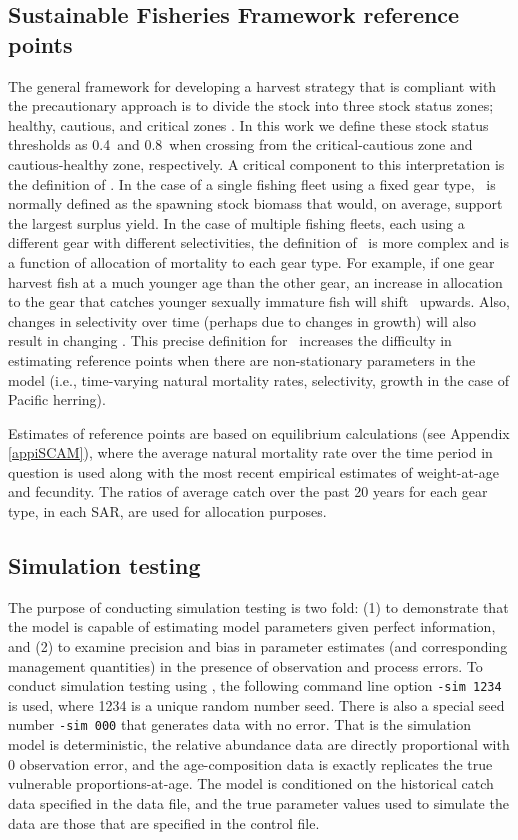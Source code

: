 	\subsection{Sustainable Fisheries Framework reference points}
	The general framework for developing a harvest strategy that is compliant with the precautionary approach is to divide the stock into three stock status zones; healthy, cautious, and critical zones \citep{dfo2006}.  In this work we define these stock status thresholds as 0.4\bmsy\ and 0.8\bmsy\ when crossing from the critical-cautious zone and cautious-healthy zone, respectively.  A critical component to this interpretation is the definition of \bmsy.  In the case of a single fishing fleet using a fixed gear type, \bmsy\ is normally defined as the spawning stock biomass that would, on average, support the largest surplus yield.  In the case of multiple fishing fleets, each using a different gear with different selectivities, the definition of \bmsy\ is more complex and is a function of allocation of mortality to each gear type.  For example, if one gear harvest fish at a much younger age than the other gear, an increase in allocation to the gear that catches younger sexually immature fish will shift \bmsy\ upwards. Also, changes in selectivity over time (perhaps due to changes in growth) will also result in changing \bmsy.  This precise definition for \bmsy\ increases the difficulty in estimating reference points when there are non-stationary parameters in the model (i.e., time-varying natural mortality rates, selectivity, growth in the case of Pacific herring).
	
	Estimates of reference points are based on equilibrium calculations (see Appendix \ref{appiSCAM}), where the average natural mortality rate over the time period in question is used along with the most recent empirical estimates of weight-at-age and fecundity.  The ratios of average catch over the past 20 years for each gear type, in each SAR, are used for allocation purposes. 
	
	
	

	
	\subsection{Simulation testing}
	
		The purpose of conducting simulation testing is two fold: (1) to demonstrate that the model is capable of estimating model parameters given perfect information, and (2) to examine precision and bias in parameter estimates (and corresponding management quantities) in the presence of observation and process errors.  To conduct simulation testing using \iscam, the following command line option \verb"-sim 1234" is used, where 1234 is a unique random number seed.  There is also a special seed number \verb"-sim 000" that generates data with no error.  That is the simulation model is deterministic, the relative abundance data are directly proportional with 0 observation error, and the age-composition data is exactly replicates the true vulnerable proportions-at-age.  The model is conditioned on the historical catch data specified in the data file, and the true parameter values used to simulate the data are those that are specified in the control file.

